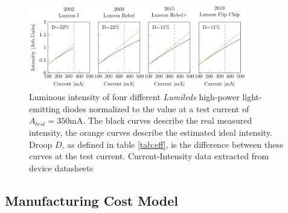 \documentclass[a4paper,nocompress]{spie}  %
\begin{document}
        \begin{figure} [ht]
            \begin{center}
                \includegraphics[width=0.85\textwidth]{SPIE/article/droop_lumileds.pdf}
            \end{center}
            \caption{Luminous intensity of four different \textit{Lumileds} high-power light-emitting diodes normalized to the value at a test current of $A_{test}=350$mA. The black curves describe the real measured intensity, the orange curves describe the estimated ideal intensity. Droop $D$, as defined in table \ref{tab:eff}, is the difference between these curves at the test current. Current-Intensity data extracted from device datasheets \cite{datasheet_lumileds_lux1,datasheet_lumileds_rebel,datasheet_lumileds_rebplus,lumi2019data}}
            \label{fig:droop}
        \end{figure}



    \subsection{Manufacturing Cost Model}
\end{document}
